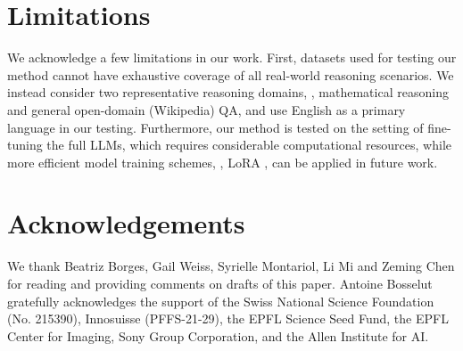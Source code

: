\section*{Limitations}
We acknowledge a few limitations in our work.
First, datasets used for testing our method cannot have exhaustive coverage of all real-world reasoning scenarios.
We instead consider two representative reasoning domains, \ie{}, mathematical reasoning and general open-domain (Wikipedia) QA, and use English as a primary language in our testing.
Furthermore, our method is tested on the setting of fine-tuning the full LLMs, which requires considerable computational resources, while more efficient model training schemes, \eg{}, LoRA \citep{hu2021lora}, can be applied in future work.

\section*{Acknowledgements}
We thank Beatriz Borges, Gail Weiss, Syrielle Montariol, Li Mi and Zeming Chen for reading and providing comments on drafts of this paper.
Antoine Bosselut gratefully acknowledges the support of the Swiss National Science Foundation (No. 215390), Innosuisse (PFFS-21-29), the EPFL Science Seed Fund, the EPFL Center for Imaging, Sony Group Corporation, and the Allen Institute for AI.

